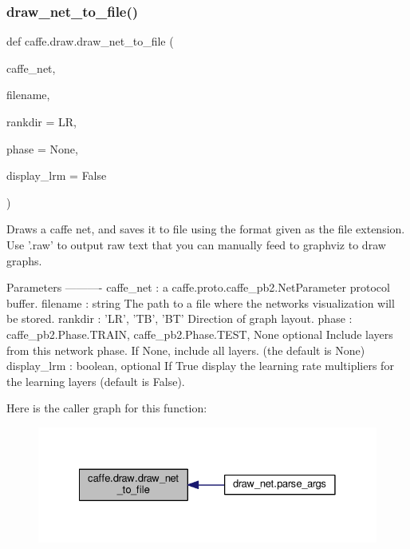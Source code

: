 \subsubsection{\texorpdfstring{draw\+\_\+net\+\_\+to\+\_\+file()}{draw\_net\_to\_file()}}
{\footnotesize\ttfamily def caffe.\+draw.\+draw\+\_\+net\+\_\+to\+\_\+file (\begin{DoxyParamCaption}\item[{}]{caffe\+\_\+net,  }\item[{}]{filename,  }\item[{}]{rankdir = {\ttfamily \textquotesingle{}LR\textquotesingle{}},  }\item[{}]{phase = {\ttfamily None},  }\item[{}]{display\+\_\+lrm = {\ttfamily False} }\end{DoxyParamCaption})}

\begin{DoxyVerb}Draws a caffe net, and saves it to file using the format given as the
file extension. Use '.raw' to output raw text that you can manually feed
to graphviz to draw graphs.

Parameters
----------
caffe_net : a caffe.proto.caffe_pb2.NetParameter protocol buffer.
filename : string
    The path to a file where the networks visualization will be stored.
rankdir : {'LR', 'TB', 'BT'}
    Direction of graph layout.
phase : {caffe_pb2.Phase.TRAIN, caffe_pb2.Phase.TEST, None} optional
    Include layers from this network phase.  If None, include all layers.
    (the default is None)
display_lrm : boolean, optional
    If True display the learning rate multipliers for the learning layers
    (default is False).
\end{DoxyVerb}
 Here is the caller graph for this function\+:
\nopagebreak
\begin{figure}[H]
\begin{center}
\leavevmode
\includegraphics[width=328pt]{namespacecaffe_1_1draw_a1955d119b9b325ea2ad20254b3dc80e3_icgraph}
\end{center}
\end{figure}
\mbox{\label{namespacecaffe_1_1draw_a672545af1643af2c11e6b19226eaf6c4}} 
